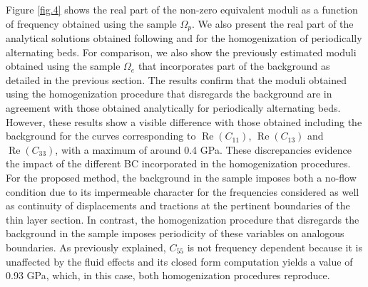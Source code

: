 \documentclass[draft]{agujournal2019}
\renewcommand{\Re}{\operatorname{Re} }
\begin{document}
Figure \ref{fig.4} shows the real part of the non-zero equivalent moduli as a function of frequency obtained using the sample $\Omega_p$. We also present the real part of the analytical solutions obtained following  and  for the homogenization of periodically alternating beds. 
For comparison, we also show the previously estimated moduli obtained using the sample $\Omega_e$ that incorporates part of the background as detailed in the previous section. The results confirm that the moduli obtained  using the homogenization procedure that disregards the background are in agreement with those obtained analytically for periodically alternating beds. However, these results show
a visible difference with those obtained including the background for the curves corresponding to $\Re(C_{11})$, $\Re(C_{13})$ and $\Re(C_{33})$, with a maximum of around 0.4 GPa. These discrepancies evidence the impact of the different BC incorporated in the homogenization procedures. For the proposed method, the  background in the sample imposes both a no-flow condition due to its impermeable character for the frequencies considered as well as continuity of displacements and tractions at the pertinent boundaries of the thin layer section. In contrast, the  homogenization procedure that disregards the background in the sample imposes periodicity of these variables on analogous boundaries. 
As previously explained, $C_{55}$ is not frequency dependent because it is unaffected by the fluid effects and its closed form computation yields a value of 0.93 GPa, which, in this case, both homogenization procedures reproduce.
\end{document}
